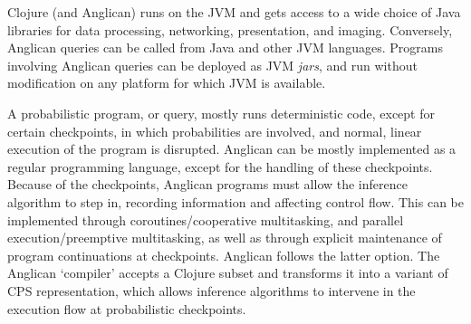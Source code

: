 \documentclass[preprint]{sigplanconf}
\begin{document}
Clojure (and Anglican) runs on the JVM and gets access to a wide choice of Java
libraries for data processing, networking, presentation, and imaging.
Conversely, Anglican queries can be called from Java and other JVM languages.
Programs involving Anglican queries can be deployed as JVM
\textit{jars}, and run without modification on any platform for
which JVM is available.

A probabilistic program, or query, mostly runs deterministic
code, except for certain checkpoints, in which probabilities are
involved, and normal, linear execution of the program is
disrupted.
\iftoggle{full}{%
In Anglican and similar languages there are two types
of such checkpoints:

\begin{itemize}
    \item drawing a value from a random source (\texttt{sample});
    \item conditioning a computed value on a random source
        (\texttt{observe}).
\end{itemize}

}{%
}%
Anglican can be mostly implemented as a regular programming
language, except for the handling of these checkpoints.
\iftoggle{full}{%
Depending on the \textit{inference algorithm}, \texttt{sample}
and \texttt{observe} may result in implicit input/output
operations and control changes. For example, \texttt{observe} in
particle filtering inference algorithms \cite{WVM14} is a non-deterministic
control statement at which a particle (corresponding to
a user-level thread executing a program)
can be either replicated or terminated. Similarly, in 
Metropolis-Hastings \cite{WSG11},
\texttt{sample} is both an input
statement which `reads' values from a random source,
and a non-deterministic control statement
(with delayed effect), eventually affecting acceptance or
rejection of a sample.

}{%
}%
Because of the checkpoints, Anglican programs must allow the
inference algorithm to step in, recording information and
affecting control flow. This can be implemented through
coroutines/cooperative multitasking, and parallel execution/preemptive
multitasking, as well as through explicit
maintenance of program continuations at checkpoints. Anglican
follows the latter option.
\iftoggle{full}{%
Clojure is a functional language, and continuation-passing style
(CPS) transformation is a well-developed technique in the area
of functional languages. Implementing a variant of CPS
transformation seemed to be the most flexible and lightweight
option --- any other form of concurrency would put a higher
burden on the underlying runtime (JVM) and the operating system.
Consequently, Anglican has been implemented as a CPS-transformed
computation with access to continuations in probabilistic
checkpoints. 
}{%
}%
The Anglican `compiler'\iftoggle{full}{, represented by a set of
functions in the \texttt{anglican.trap} namespace,}{} accepts a
Clojure subset and transforms it into a variant of CPS
representation, which allows inference algorithms to intervene
in the execution flow at probabilistic checkpoints.
\end{document}
